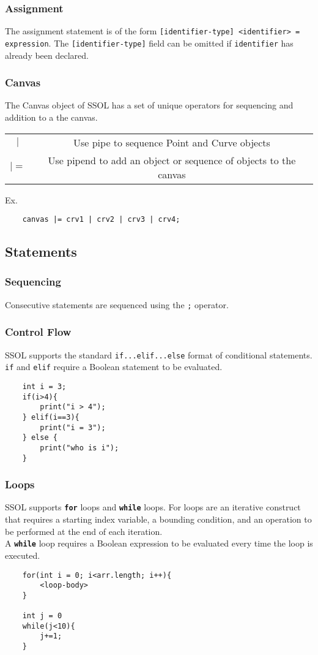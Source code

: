 \documentclass{article}
\begin{document}
\subsubsection{Assignment}
The assignment statement is of the form \texttt{[identifier-type] <identifier> = expression}. The \texttt{[identifier-type]} field can be omitted if \texttt{identifier} has already been declared.

\subsubsection{Canvas}
The Canvas object of SSOL has a set of unique operators for sequencing and addition to a the canvas. 
\begin{center}
    \begin{tabular}{|c|c|}
        \hline
        $|$ & Use pipe to sequence Point and Curve objects \\
        $|=$ & Use pipend to add an object or sequence of objects to the canvas\\
        \hline
    \end{tabular}
\end{center}
Ex. \begin{verbatim}
    canvas |= crv1 | crv2 | crv3 | crv4;
\end{verbatim}

\subsection{Statements}

\subsubsection{Sequencing}
Consecutive statements are sequenced using the \texttt{;} operator.
\subsubsection{Control Flow}
SSOL supports the standard \texttt{if...elif...else} format of conditional statements. 
\texttt{if} and \texttt{elif} require a Boolean statement to be evaluated.
\begin{verbatim}
    int i = 3;
    if(i>4){
        print("i > 4");
    } elif(i==3){
        print("i = 3");
    } else {
        print("who is i");
    }
\end{verbatim}
\subsubsection{Loops}
SSOL supports \texttt{\bf for} loops and \texttt{\bf while} loops. For loops are an iterative construct that requires a starting index variable, a bounding condition, and an operation to be performed at the end of each iteration.\\
A \texttt{\bf while} loop requires a Boolean expression to be evaluated every time the loop is executed.
\begin{verbatim}
    for(int i = 0; i<arr.length; i++){
        <loop-body>
    }
    
    int j = 0
    while(j<10){
        j+=1;
    }
\end{verbatim}
\end{document}
